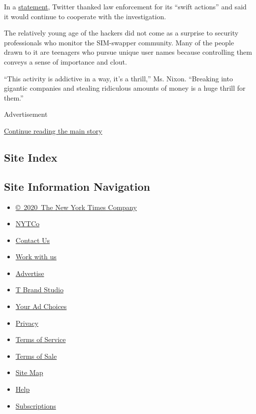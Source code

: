 In a
\href{https://twitter.com/TwitterComms/status/1289267856333402112}{statement},
Twitter thanked law enforcement for its ``swift actions'' and said it
would continue to cooperate with the investigation.

The relatively young age of the hackers did not come as a surprise to
security professionals who monitor the SIM-swapper community. Many of
the people drawn to it are teenagers who pursue unique user names
because controlling them conveys a sense of importance and clout.

``This activity is addictive in a way, it's a thrill,'' Ms. Nixon.
``Breaking into gigantic companies and stealing ridiculous amounts of
money is a huge thrill for them.''

Advertisement

\protect\hyperlink{after-bottom}{Continue reading the main story}

\hypertarget{site-index}{%
\subsection{Site Index}\label{site-index}}

\hypertarget{site-information-navigation}{%
\subsection{Site Information
Navigation}\label{site-information-navigation}}

\begin{itemize}
\tightlist
\item
  \href{https://help.nytimes.com/hc/en-us/articles/115014792127-Copyright-notice}{©~2020~The
  New York Times Company}
\end{itemize}

\begin{itemize}
\tightlist
\item
  \href{https://www.nytco.com/}{NYTCo}
\item
  \href{https://help.nytimes.com/hc/en-us/articles/115015385887-Contact-Us}{Contact
  Us}
\item
  \href{https://www.nytco.com/careers/}{Work with us}
\item
  \href{https://nytmediakit.com/}{Advertise}
\item
  \href{http://www.tbrandstudio.com/}{T Brand Studio}
\item
  \href{https://www.nytimes.com/privacy/cookie-policy\#how-do-i-manage-trackers}{Your
  Ad Choices}
\item
  \href{https://www.nytimes.com/privacy}{Privacy}
\item
  \href{https://help.nytimes.com/hc/en-us/articles/115014893428-Terms-of-service}{Terms
  of Service}
\item
  \href{https://help.nytimes.com/hc/en-us/articles/115014893968-Terms-of-sale}{Terms
  of Sale}
\item
  \href{https://spiderbites.nytimes.com}{Site Map}
\item
  \href{https://help.nytimes.com/hc/en-us}{Help}
\item
  \href{https://www.nytimes.com/subscription?campaignId=37WXW}{Subscriptions}
\end{itemize}
